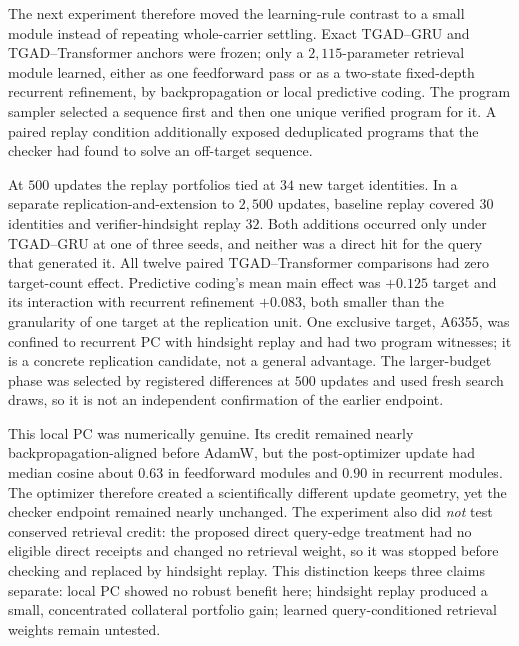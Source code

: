 \documentclass[11pt]{article}
\begin{document}
The next experiment therefore moved the learning-rule contrast to a small module instead
of repeating whole-carrier settling.  Exact TGAD--GRU and TGAD--Transformer anchors were
frozen; only a $2{,}115$-parameter retrieval module learned, either as one feedforward pass
or as a two-state fixed-depth recurrent refinement, by backpropagation or local predictive
coding.  The program sampler selected a sequence first and then one unique verified
program for it.  A paired replay condition additionally exposed deduplicated programs
that the checker had found to solve an off-target sequence.

At $500$ updates the replay portfolios tied at $34$ new target identities.  In a separate
replication-and-extension to $2{,}500$ updates, baseline replay covered $30$ identities
and verifier-hindsight replay $32$.  Both additions occurred only under TGAD--GRU at one
of three seeds, and neither was a direct hit for the query that generated it.  All twelve
paired TGAD--Transformer comparisons had zero target-count effect.  Predictive coding's
mean main effect was $+0.125$ target and its interaction with recurrent refinement
$+0.083$, both smaller than the granularity of one target at the replication unit.  One
exclusive target, A6355, was confined to recurrent PC with hindsight replay and had two
program witnesses; it is a concrete replication candidate, not a general advantage.
The larger-budget phase was selected by registered differences at $500$ updates and used
fresh search draws, so it is not an independent confirmation of the earlier endpoint.

This local PC was numerically genuine.  Its credit remained nearly backpropagation-aligned
before AdamW, but the post-optimizer update had median cosine about $0.63$ in feedforward
modules and $0.90$ in recurrent modules.  The optimizer therefore created a scientifically
different update geometry, yet the checker endpoint remained nearly unchanged.  The
experiment also did \emph{not} test conserved retrieval credit: the proposed direct
query-edge treatment had no eligible direct receipts and changed no retrieval weight, so
it was stopped before checking and replaced by hindsight replay.  This distinction keeps
three claims separate: local PC showed no robust benefit here; hindsight replay produced
a small, concentrated collateral portfolio gain; learned query-conditioned retrieval
weights remain untested.
\end{document}
